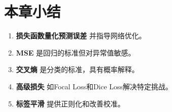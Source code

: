 \section{本章小结}

\begin{enumerate}
    \item \textbf{损失函数量化预测误差} 并指导网络优化。
    \item \textbf{MSE} 是回归的标准但对异常值敏感。
    \item \textbf{交叉熵} 是分类的标准，具有概率解释。
    \item \textbf{高级损失} 如Focal Loss和Dice Loss解决特定挑战。
    \item \textbf{标签平滑} 提供正则化和改善校准。
\end{enumerate}
